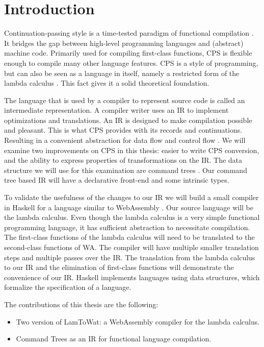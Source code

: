 
\chapter{\label{chap:introduction}Introduction}

Continuation-passing style is a time-tested paradigm of functional compilation \autocite{steele1978rabbit, DBLP:books/daglib/0022396}. It bridges the gap between high-level programming languages and (abstract) machine code. Primarily used for compiling first-class functions, CPS is flexible enough to compile many other language features. CPS is a style of programming, but can also be seen as a language in itself, namely a restricted form of the lambda calculus \autocite{barendregt1984lambda}. This fact gives it a solid theoretical foundation.

The language that is used by a compiler to represent source code is called an intermediate representation. A compiler writer uses an IR to implement optimizations and translations. An IR is designed to make compilation possible and pleasant. This is what CPS provides with its records and continuations. Resulting in a convenient abstraction for data flow and control flow \autocite{bruin2020framevm}. We will examine two improvements on CPS in this thesis: easier to write CPS conversion, and the ability to express properties of transformations on the IR. The data structure we will use for this examination are command trees \autocite{commandtreespoulsen}. Our command tree based IR will have a declarative front-end and some intrinsic types.

To validate the usefulness of the changes to our IR we will build a small compiler in Haskell \autocite{haskellhomepage} for a language similar to WebAssembly \autocite{webassemblyhomepage}. Our source language will be the lambda calculus. Even though the lambda calculus is a very simple functional programming language, it has sufficient abstraction to necessitate compilation. The first-class functions of the lambda calculus will need to be translated to the second-class functions of WA. The compiler will have multiple smaller translation steps and multiple passes over the IR. The translation from the lambda calculus to our IR and the elimination of first-class functions will demonstrate the convenience of our IR. Haskell implements languages using data structures, which formalize the specification of a language.

The contributions of this thesis are the following:
\begin{itemize}
\item Two version of LamToWat: a WebAssembly compiler for the lambda calculus.
\item Command Trees as an IR for functional language compilation.
\end{itemize}

